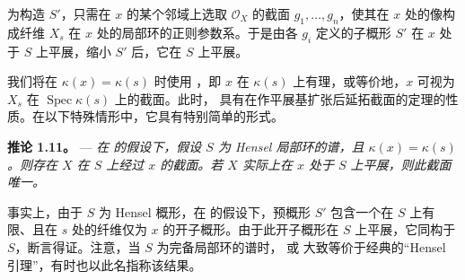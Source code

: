 为构造 \(S'\)，只需在 \(x\) 的某个邻域上选取 \(\mathscr O_X\) 的截面 \(g_1,\ldots,g_n\)，使其在 \(x\) 处的像构成纤维 \(X_s\) 在 \(x\) 处的局部环的正则参数系。于是由各 \(g_i\) 定义的子概形 \(S'\) 在 \(x\) 处于 \(S\) 上平展，缩小 \(S'\) 后，它在 \(S\) 上平展。

我们将在 \(\kappa(x)=\kappa(s)\) 时使用 ，即 \(x\) 在 \(\kappa(s)\) 上有理，或等价地，\(x\) 可视为 \(X_s\) 在 \(\operatorname{Spec}\kappa(s)\) 上的截面。此时， 具有在作平展基扩张后延拓截面的定理的性质。在以下特殊情形中，它具有特别简单的形式。

\medskip\noindent{}\textbf{推论 1.11。} --- \textit{在  的假设下，假设 \(S\) 为 Hensel 局部环的谱，且 \(\kappa(x)=\kappa(s)\)。则存在 \(X\) 在 \(S\) 上经过 \(x\) 的截面。若 \(X\) 实际上在 \(x\) 处于 \(S\) 上平展，则此截面唯一。}

事实上，由于 \(S\) 为 Hensel 概形，在  的假设下，预概形 \(S'\) 包含一个在 \(S\) 上有限、且在 \(s\) 处的纤维仅为 \(x\) 的开子概形。由于此开子概形在 \(S\) 上平展，它同构于 \(S\)，断言得证。注意，当 \(S\) 为完备局部环的谱时， 或  大致等价于经典的“Hensel 引理”，有时也以此名指称该结果。


